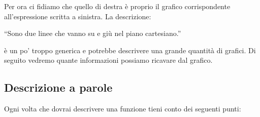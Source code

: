 \vspace{.5em}
Per ora ci fidiamo che quello di destra è proprio il grafico corrispondente 
all'espressione scritta a sinistra.
La descrizione:
\vspace{-.5em}
\begin{center}
 ``Sono due linee che vanno su e giù nel piano cartesiano.''
\end{center}
\vspace{-.5em}
è un po' troppo generica e potrebbe descrivere una grande quantità di grafici.
Di seguito vedremo quante informazioni possiamo ricavare dal grafico.

\subsection{Descrizione a parole}

Ogni volta che dovrai descrivere una funzione tieni conto dei seguenti punti:

 

